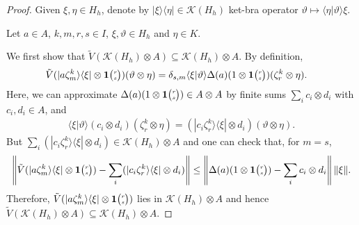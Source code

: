  \begin{proof}
   Given $\xi,\eta\in H_{h}$, denote by $|\xi\rangle\langle \eta| \in \mathcal{K}(H_{h})$ ket-bra   operator $\vartheta \mapsto \langle \eta|\vartheta\rangle \xi$. 

   Let $a\in A$, $k,m,r,s\in I$, $\xi,\vartheta \in H_{h}$ and   $\eta\in K$. 
   
   We first show that $\tilde V(\mathcal{K}(H_{h})\otimes A) \subseteq
   \mathcal{K}(H_{h}) \otimes A$. By definition,
\begin{align*}
     \tilde V(|a\zeta^{k}_{m}\rangle\langle \xi| \otimes \mathbf{1}{\tiny {\begin{pmatrix} r\\s\end{pmatrix}}})(\vartheta \otimes \eta) 
     &=     \delta_{s,m} \langle \xi|\vartheta\rangle \Delta(a)(1 \otimes \mathbf{1}{\tiny {\begin{pmatrix} r\\s\end{pmatrix}}})(\zeta^{k}_{r}
     \otimes \eta).
   \end{align*} 
   Here, we can approximate $\Delta(a)(1\otimes \mathbf{1}{\tiny {\begin{pmatrix} r\\s\end{pmatrix}}}) \in A\otimes A$ by finite sums $\sum_{i} c_{i} \otimes
   d_{i}$ with $c_{i},d_{i} \in A$, and
   \begin{align*}
 \langle \xi|\vartheta\rangle (c_{i} \otimes
d_{i})(\zeta^{k}_{r} \otimes \eta) = 
 (|c_{i}\zeta^{k}_{r}\rangle\langle \xi| \otimes d_{i}) (\vartheta \otimes \eta).
   \end{align*}
  But  $\sum_{i} (|c_{i}\zeta^{k}_{r}\rangle\langle \xi| \otimes d_{i}) \in \mathcal{K}(H_{h}) \otimes
A$  and  one can check that, %
for $m=s$, 
   \begin{align*}
     \left\|\tilde V(|a\zeta^{k}_{m}\rangle\langle \xi| \otimes \mathbf{1}{\tiny {\begin{pmatrix} r\\s\end{pmatrix}}}) -      \sum_{i}
       (|c_{i}\zeta^{k}_{r}\rangle\langle \xi| \otimes d_{i})\right\| \leq
     \left\|\Delta(a)(1\otimes \mathbf{1}{\tiny {\begin{pmatrix} r\\s\end{pmatrix}}}) -  \sum_{i} c_{i} \otimes
   d_{i}\right\| \|\xi\|.
   \end{align*}
   Therefore, $\tilde V(|a\zeta^{k}_{m}\rangle\langle \xi| \otimes \mathbf{1}{\tiny {\begin{pmatrix} r\\s\end{pmatrix}}})$ lies in   $\mathcal{K}(H_{h}) \otimes A$ and hence $\tilde V(\mathcal{K}(H_{h})\otimes A) \subseteq
   \mathcal{K}(H_{h}) \otimes A$.
   


\end{proof}
